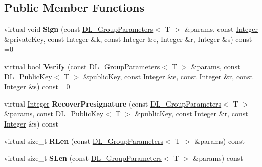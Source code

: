 \subsection*{Public Member Functions}
\begin{DoxyCompactItemize}
\item 
\hypertarget{class_d_l___elgamal_like_signature_algorithm_a033808f79700a901d7fb183e6dab247a}{
virtual void {\bfseries Sign} (const \hyperlink{class_d_l___group_parameters}{DL\_\-GroupParameters}$<$ T $>$ \&params, const \hyperlink{class_integer}{Integer} \&privateKey, const \hyperlink{class_integer}{Integer} \&k, const \hyperlink{class_integer}{Integer} \&e, \hyperlink{class_integer}{Integer} \&r, \hyperlink{class_integer}{Integer} \&s) const =0}
\label{class_d_l___elgamal_like_signature_algorithm_a033808f79700a901d7fb183e6dab247a}

\item 
\hypertarget{class_d_l___elgamal_like_signature_algorithm_af1f4e4ba20583c45514ece27cf97b8d2}{
virtual bool {\bfseries Verify} (const \hyperlink{class_d_l___group_parameters}{DL\_\-GroupParameters}$<$ T $>$ \&params, const \hyperlink{class_d_l___public_key}{DL\_\-PublicKey}$<$ T $>$ \&publicKey, const \hyperlink{class_integer}{Integer} \&e, const \hyperlink{class_integer}{Integer} \&r, const \hyperlink{class_integer}{Integer} \&s) const =0}
\label{class_d_l___elgamal_like_signature_algorithm_af1f4e4ba20583c45514ece27cf97b8d2}

\item 
\hypertarget{class_d_l___elgamal_like_signature_algorithm_a282eefef119472f0c7c2c05c320af9f3}{
virtual \hyperlink{class_integer}{Integer} {\bfseries RecoverPresignature} (const \hyperlink{class_d_l___group_parameters}{DL\_\-GroupParameters}$<$ T $>$ \&params, const \hyperlink{class_d_l___public_key}{DL\_\-PublicKey}$<$ T $>$ \&publicKey, const \hyperlink{class_integer}{Integer} \&r, const \hyperlink{class_integer}{Integer} \&s) const }
\label{class_d_l___elgamal_like_signature_algorithm_a282eefef119472f0c7c2c05c320af9f3}

\item 
\hypertarget{class_d_l___elgamal_like_signature_algorithm_a23ac5172e324bb94f835032b8f2cc175}{
virtual size\_\-t {\bfseries RLen} (const \hyperlink{class_d_l___group_parameters}{DL\_\-GroupParameters}$<$ T $>$ \&params) const }
\label{class_d_l___elgamal_like_signature_algorithm_a23ac5172e324bb94f835032b8f2cc175}

\item 
\hypertarget{class_d_l___elgamal_like_signature_algorithm_ab213028630c877842aa40609ff842dcb}{
virtual size\_\-t {\bfseries SLen} (const \hyperlink{class_d_l___group_parameters}{DL\_\-GroupParameters}$<$ T $>$ \&params) const }
\label{class_d_l___elgamal_like_signature_algorithm_ab213028630c877842aa40609ff842dcb}

\end{DoxyCompactItemize}


